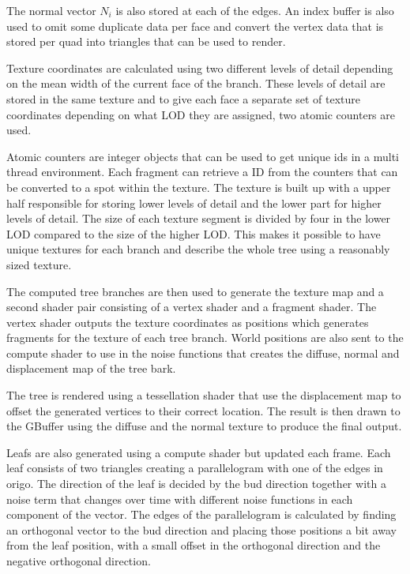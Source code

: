 \documentclass[11pt]{article} %
\begin{document}
The normal vector $ N_{i} $ is also stored at each of the edges.
An index buffer is also used to omit some duplicate data per face and convert the vertex data that is stored per quad into triangles that can be used to render.

Texture coordinates are calculated using two different levels of detail depending on the mean width of the current face of the branch.
These levels of detail are stored in the same texture and to give each face a separate set of texture coordinates depending on what LOD they are assigned, two atomic counters are used.

Atomic counters are integer objects that can be used to get unique ids in a multi thread environment.
Each fragment can retrieve a ID from the counters that can be converted to a spot within the texture.
The texture is built up with a upper half responsible for storing lower levels of detail and the lower part for higher levels of detail.
The size of each texture segment is divided by four in the lower LOD compared to the size of the higher LOD.
This makes it possible to have unique textures for each branch and describe the whole tree using a reasonably sized texture.

The computed tree branches are then used to generate the texture map and a second shader pair consisting of a vertex shader and a fragment shader.
The vertex shader outputs the texture coordinates as positions which generates fragments for the texture of each tree branch.
World positions are also sent to the compute shader to use in the noise functions that creates the diffuse, normal and displacement map of the tree bark.

The tree is rendered using a tessellation shader that use the displacement map to offset the generated vertices to their correct location.
The result is then drawn to the GBuffer using the diffuse and the normal texture to produce the final output.

Leafs are also generated using a compute shader but updated each frame.
Each leaf consists of two triangles creating a parallelogram with one of the edges in origo.
The direction of the leaf is decided by the bud direction together with a noise term that changes over time with different noise functions in each component of the vector.
The edges of the parallelogram is calculated by finding an orthogonal vector to the bud direction and placing those positions a bit away from the leaf position, with a small offset in the orthogonal direction and the negative orthogonal direction.
\end{document}
